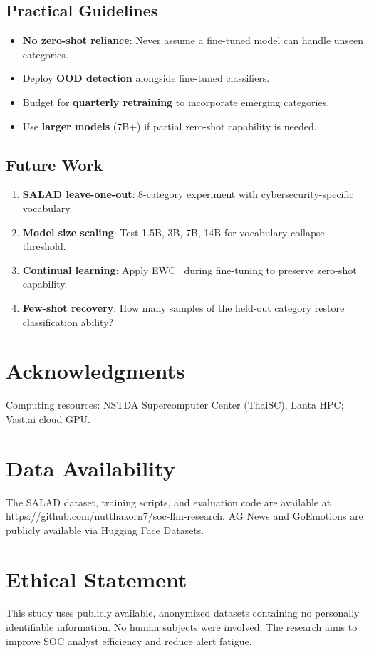 \documentclass[journal]{IEEEtran}
\begin{document}
\subsection{Practical Guidelines}
\begin{itemize}
\item \textbf{No zero-shot reliance}: Never assume a fine-tuned model can handle unseen categories.
\item Deploy \textbf{OOD detection} alongside fine-tuned classifiers.
\item Budget for \textbf{quarterly retraining} to incorporate emerging categories.
\item Use \textbf{larger models} (7B+) if partial zero-shot capability is needed.
\end{itemize}

\subsection{Future Work}
\begin{enumerate}
\item \textbf{SALAD leave-one-out}: 8-category experiment with cybersecurity-specific vocabulary.
\item \textbf{Model size scaling}: Test 1.5B, 3B, 7B, 14B for vocabulary collapse threshold.
\item \textbf{Continual learning}: Apply EWC~\cite{kirkpatrick2017} during fine-tuning to preserve zero-shot capability.
\item \textbf{Few-shot recovery}: How many samples of the held-out category restore classification ability?
\end{enumerate}

\section*{Acknowledgments}
Computing resources: NSTDA Supercomputer Center (ThaiSC), Lanta HPC; Vast.ai cloud GPU.


\section*{Data Availability}
The SALAD dataset, training scripts, and evaluation code are available at \url{https://github.com/nutthakorn7/soc-llm-research}. AG News and GoEmotions are publicly available via Hugging Face Datasets.

\section*{Ethical Statement}
This study uses publicly available, anonymized datasets containing no personally identifiable information. No human subjects were involved. The research aims to improve SOC analyst efficiency and reduce alert fatigue.
\end{document}
